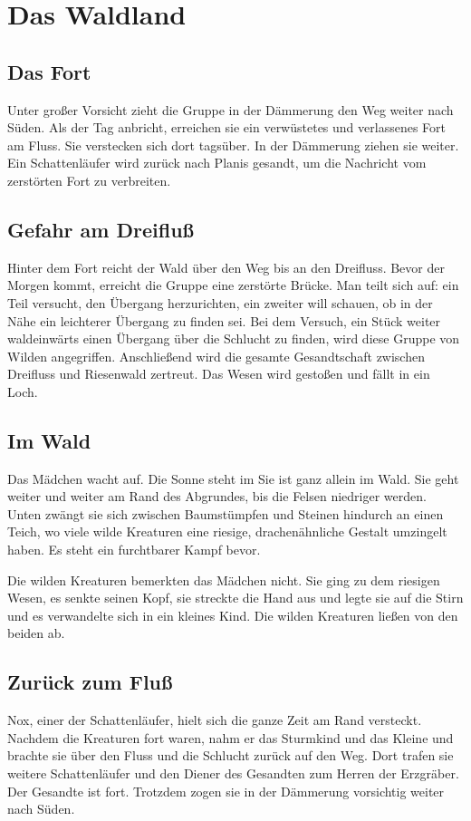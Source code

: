\chapter{Das Waldland}
\section{Das Fort}
Unter großer Vorsicht zieht die Gruppe in der Dämmerung den Weg weiter nach Süden. Als der Tag anbricht, erreichen sie ein verwüstetes und verlassenes Fort am Fluss. Sie verstecken sich dort tagsüber. In der Dämmerung ziehen sie weiter. Ein Schattenläufer wird zurück nach Planis gesandt, um die Nachricht vom zerstörten Fort zu verbreiten.

\section{Gefahr am Dreifluß}
Hinter dem Fort reicht der Wald über den Weg bis an den Dreifluss. Bevor der Morgen kommt, erreicht die Gruppe eine zerstörte Brücke. Man teilt sich auf: ein Teil versucht, den Übergang herzurichten, ein zweiter will schauen, ob in der Nähe ein leichterer Übergang zu finden sei. Bei dem Versuch, ein Stück weiter waldeinwärts einen Übergang über die Schlucht zu finden, wird diese Gruppe von Wilden angegriffen. Anschließend wird die gesamte Gesandtschaft zwischen Dreifluss und Riesenwald zertreut. Das Wesen wird gestoßen und fällt in ein Loch.

\section{Im Wald}
Das Mädchen wacht auf. Die Sonne steht im Sie ist ganz allein im Wald. Sie geht weiter und weiter am Rand des Abgrundes, bis die Felsen niedriger werden. Unten zwängt sie sich zwischen Baumstümpfen und Steinen hindurch an einen Teich, wo viele wilde Kreaturen eine riesige, drachenähnliche Gestalt umzingelt haben. Es steht ein furchtbarer Kampf bevor.

Die wilden Kreaturen bemerkten das Mädchen nicht. Sie ging zu dem riesigen Wesen, es senkte seinen Kopf, sie streckte die Hand aus und legte sie auf die Stirn und es verwandelte sich in ein kleines Kind. Die wilden Kreaturen ließen von den beiden ab.

\section{Zurück zum Fluß}
Nox, einer der Schattenläufer, hielt sich die ganze Zeit am Rand versteckt. Nachdem die Kreaturen fort waren, nahm er das Sturmkind und das Kleine und brachte sie über den Fluss und die Schlucht zurück auf den Weg. Dort trafen sie weitere Schattenläufer und den Diener des Gesandten zum Herren der Erzgräber. Der Gesandte ist fort. Trotzdem zogen sie in der Dämmerung vorsichtig weiter nach Süden.

